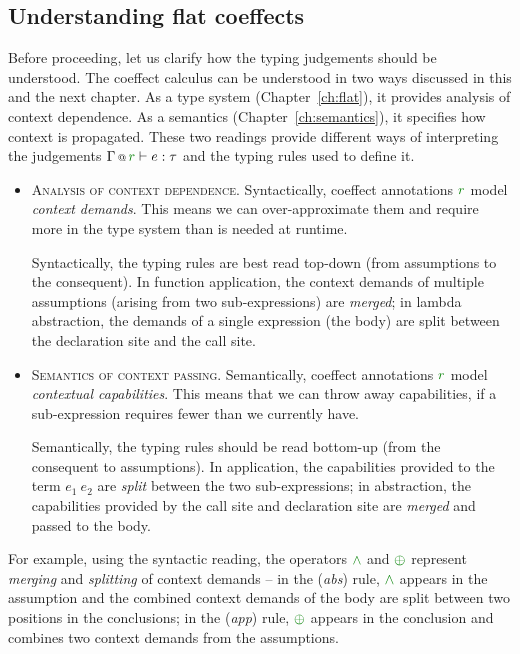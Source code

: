 \subsection{Understanding flat coeffects}
\label{sec:flat-calculus-understanding}

Before proceeding, let us clarify how the typing judgements should be understood. The coeffect
calculus can be understood in two ways discussed in this and the next chapter. As a type system
(Chapter~\ref{ch:flat}), it provides analysis of context dependence. As a semantics
(Chapter~\ref{ch:semantics}), it specifies how context is propagated. These two readings provide
different ways of interpreting the judgements $\coctx{\Gamma}{\cclrd{r}} \vdash e : \tau$ and the
typing rules used to define it.

\begin{itemize}
\item \textsc{Analysis of context dependence.}
Syntactically, coeffect annotations $\cclrd{r}$ model \emph{context demands}. This means
we can over-approximate them and require more in the type system than is needed at runtime.

Syntactically, the typing rules are best read top-down (from assumptions to the consequent).
In function application, the context demands of multiple assumptions (arising from two
sub-expressions) are \emph{merged}; in lambda abstraction, the demands of a single expression
(the body) are split between the declaration site and the call site.

\item \textsc{Semantics of context passing.}
Semantically, coeffect annotations $\cclrd{r}$ mo\-del \emph{contextual capabilities}. This means
that we can throw away capabilities, if a sub-expression requires fewer than we
currently have.

Semantically, the typing rules should be read bottom-up (from the consequent to assumptions).
In application, the capabilities provided to the term $e_1~e_2$ are \emph{split} between the
two sub-expressions; in abstraction, the capabilities provided by the call site and declaration
site are \emph{merged} and passed to the body.
\end{itemize}

\noindent
For example, using the syntactic reading, the operators $\czip$ and $\cpar$ represent \emph{merging}
and \emph{splitting} of context demands -- in the (\emph{abs}) rule, $\czip$ appears in the assumption
and the combined context demands of the body are split between two positions in the conclusions;
in the (\emph{app}) rule, $\cpar$ appears in the conclusion and combines two context demands
from the assumptions.


